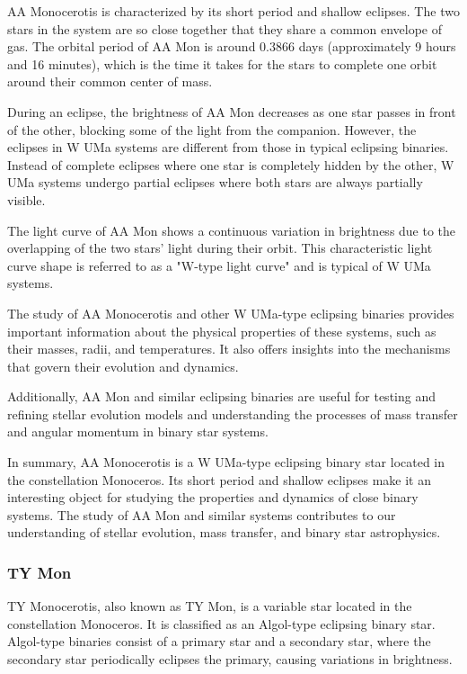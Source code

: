AA Monocerotis is characterized by its short period and shallow eclipses. The two stars in the system are so close together that they share a common envelope of gas. The orbital period of AA Mon is around 0.3866 days (approximately 9 hours and 16 minutes), which is the time it takes for the stars to complete one orbit around their common center of mass.

During an eclipse, the brightness of AA Mon decreases as one star passes in front of the other, blocking some of the light from the companion. However, the eclipses in W UMa systems are different from those in typical eclipsing binaries. Instead of complete eclipses where one star is completely hidden by the other, W UMa systems undergo partial eclipses where both stars are always partially visible.

The light curve of AA Mon shows a continuous variation in brightness due to the overlapping of the two stars' light during their orbit. This characteristic light curve shape is referred to as a "W-type light curve" and is typical of W UMa systems.

The study of AA Monocerotis and other W UMa-type eclipsing binaries provides important information about the physical properties of these systems, such as their masses, radii, and temperatures. It also offers insights into the mechanisms that govern their evolution and dynamics.

Additionally, AA Mon and similar eclipsing binaries are useful for testing and refining stellar evolution models and understanding the processes of mass transfer and angular momentum in binary star systems.

In summary, AA Monocerotis is a W UMa-type eclipsing binary star located in the constellation Monoceros. Its short period and shallow eclipses make it an interesting object for studying the properties and dynamics of close binary systems. The study of AA Mon and similar systems contributes to our understanding of stellar evolution, mass transfer, and binary star astrophysics.

\subsubsection*{ TY Mon }
TY Monocerotis, also known as TY Mon, is a variable star located in the constellation Monoceros. It is classified as an Algol-type eclipsing binary star. Algol-type binaries consist of a primary star and a secondary star, where the secondary star periodically eclipses the primary, causing variations in brightness.

